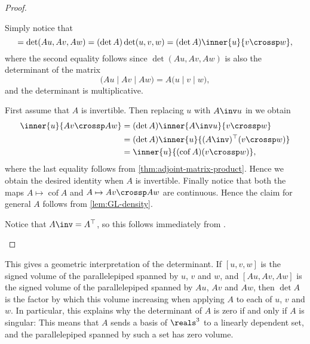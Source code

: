 \documentclass[a4paper, 11pt]{memoir}
\theoremstyle{plaincustomnumber}
\theoremstyle{changedotbreakcustomnumber}
\newcommand{\trans}{^{\top}}
\newcommand{\cof}{\operatorname{cof}}
\begin{document}
\begin{proof}
\begin{proofsec*}
    \item[\Namesubcref{enum:triple-product-transformation}]
    Simply notice that
    \begin{equation*}
        [Au, Av, Aw]
            = \det(Au, Av, Aw)
            = (\det A) \det(u,v,w)
            = (\det A) \inner{u}{v \crossp w},
    \end{equation*}
    where the second equality follows since $\det(Au, Av, Aw)$ is also the determinant of the matrix
    \begin{equation*}
        \bigl( Au \mid Av \mid Aw \bigr)
            = A \bigl( u \mid v \mid w \bigr),
    \end{equation*}
    and the determinant is multiplicative.

    \item[\Namesubcref{enum:cross-product-transformation}]
    First assume that $A$ is invertible. Then replacing $u$ with $A\inv u$ in  we obtain
    \begin{align*}
        \inner{u}{Av \crossp Aw}
            &= (\det A) \inner{A\inv u}{v \crossp w} \\
            &= (\det A) \inner{u}{(A\inv)\trans (v \crossp w)} \\
            &=  \inner{u}{(\cof A)(v \crossp w)},
    \end{align*}
    where the last equality follows from \cref{thm:adjoint-matrix-product}. Hence we obtain the desired identity when $A$ is invertible. Finally notice that both the maps $A \mapsto \cof A$ and $A \mapsto Av \crossp Aw$ are continuous. Hence the claim for general $A$ follows from \cref{lem:GL-density}.

    \item[\Namesubcref{enum:cross-product-orthogonal-transformation}]
    Notice that $A\inv = A\trans$, so this follows immediately from .
\end{proofsec*}
\end{proof}
%
This gives a geometric interpretation of the determinant. If $[u,v,w]$ is the signed volume of the parallelepiped spanned by $u$, $v$ and $w$, and $[Au,Av,Aw]$ is the signed volume of the parallelepiped spanned by $Au$, $Av$ and $Aw$, then $\det A$ is the factor by which this volume increasing when applying $A$ to each of $u$, $v$ and $w$. In particular, this explains why the determinant of $A$ is zero if and only if $A$ is singular: This means that $A$ sends a basis of $\reals^3$ to a linearly dependent set, and the parallelepiped spanned by such a set has zero volume.
\end{document}
